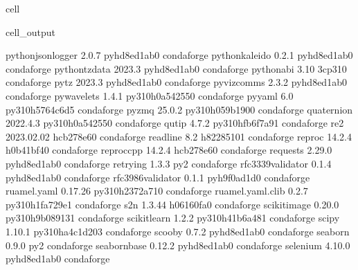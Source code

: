 \documentclass[letterpaper,table,10pt,english]{jupyterBook}
\begin{document}
\begin{sphinxuseclass}{cell}
\begin{sphinxVerbatimOutput}
\begin{sphinxuseclass}{cell_output}
\begin{sphinxVerbatim}[commandchars=\\\{\}]
python\PYGZhy{}json\PYGZhy{}logger        2.0.7              pyhd8ed1ab\PYGZus{}0    conda\PYGZhy{}forge
python\PYGZhy{}kaleido            0.2.1              pyhd8ed1ab\PYGZus{}0    conda\PYGZhy{}forge
python\PYGZhy{}tzdata             2023.3             pyhd8ed1ab\PYGZus{}0    conda\PYGZhy{}forge
python\PYGZus{}abi                3.10                    3\PYGZus{}cp310    conda\PYGZhy{}forge
pytz                      2023.3             pyhd8ed1ab\PYGZus{}0    conda\PYGZhy{}forge
pyviz\PYGZus{}comms               2.3.2              pyhd8ed1ab\PYGZus{}0    conda\PYGZhy{}forge
pywavelets                1.4.1           py310h0a54255\PYGZus{}0    conda\PYGZhy{}forge
pyyaml                    6.0             py310h5764c6d\PYGZus{}5    conda\PYGZhy{}forge
pyzmq                     25.0.2          py310h059b190\PYGZus{}0    conda\PYGZhy{}forge
quaternion                2022.4.3        py310h0a54255\PYGZus{}0    conda\PYGZhy{}forge
qutip                     4.7.2           py310hfb6f7a9\PYGZus{}1    conda\PYGZhy{}forge
re2                       2023.02.02           hcb278e6\PYGZus{}0    conda\PYGZhy{}forge
readline                  8.2                  h8228510\PYGZus{}1    conda\PYGZhy{}forge
reproc                    14.2.4               h0b41bf4\PYGZus{}0    conda\PYGZhy{}forge
reproc\PYGZhy{}cpp                14.2.4               hcb278e6\PYGZus{}0    conda\PYGZhy{}forge
requests                  2.29.0             pyhd8ed1ab\PYGZus{}0    conda\PYGZhy{}forge
retrying                  1.3.3                      py\PYGZus{}2    conda\PYGZhy{}forge
rfc3339\PYGZhy{}validator         0.1.4              pyhd8ed1ab\PYGZus{}0    conda\PYGZhy{}forge
rfc3986\PYGZhy{}validator         0.1.1              pyh9f0ad1d\PYGZus{}0    conda\PYGZhy{}forge
ruamel.yaml               0.17.26         py310h2372a71\PYGZus{}0    conda\PYGZhy{}forge
ruamel.yaml.clib          0.2.7           py310h1fa729e\PYGZus{}1    conda\PYGZhy{}forge
s2n                       1.3.44               h06160fa\PYGZus{}0    conda\PYGZhy{}forge
scikit\PYGZhy{}image              0.20.0          py310h9b08913\PYGZus{}1    conda\PYGZhy{}forge
scikit\PYGZhy{}learn              1.2.2           py310h41b6a48\PYGZus{}1    conda\PYGZhy{}forge
scipy                     1.10.1          py310ha4c1d20\PYGZus{}3    conda\PYGZhy{}forge
scooby                    0.7.2              pyhd8ed1ab\PYGZus{}0    conda\PYGZhy{}forge
seaborn                   0.9.0                      py\PYGZus{}2    conda\PYGZhy{}forge
seaborn\PYGZhy{}base              0.12.2             pyhd8ed1ab\PYGZus{}0    conda\PYGZhy{}forge
selenium                  4.10.0             pyhd8ed1ab\PYGZus{}0    conda\PYGZhy{}forge

\end{sphinxVerbatim}
\end{sphinxuseclass}
\end{sphinxVerbatimOutput}
\end{sphinxuseclass}
\end{document}
